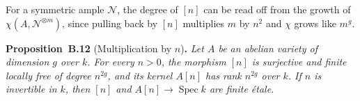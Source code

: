 \documentclass[11pt]{article}
\newenvironment{bpstatement}[2]{\par\addvspace{0.6\baselineskip}\noindent\textbf{#1}#2\textbf{.}\enspace\ignorespaces}
  {\par\addvspace{0.4\baselineskip}}
\newenvironment{bpstatementit}[2]{\begin{bpstatement}{#1}{#2}\itshape\ignorespaces}{\end{bpstatement}}
\begin{document}
\label{bp107}%
For a symmetric ample \(\mathcal N\), the degree of \([n]\) can be read off from the growth of \(\chi(A,\mathcal N^{\otimes m})\), since pulling back by \([n]\) multiplies \(m\) by \(n^2\) and \(\chi\) grows like \(m^g\).

\label{bp108}%
\begin{bpstatementit}{Proposition~B.12}{ (Multiplication by $n$)}
Let \(A\) be an abelian variety of dimension \(g\) over \(k\). For every \(n>0\), the morphism \([n]\) is surjective and finite locally free of degree \(n^{2g}\), and its kernel \(A[n]\) has rank \(n^{2g}\) over \(k\). If \(n\) is invertible in \(k\), then \([n]\) and \(A[n]\to\operatorname{Spec}k\) are finite étale.
\end{bpstatementit}
\end{document}

